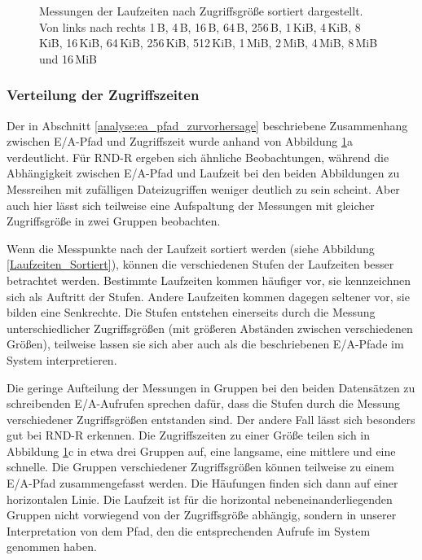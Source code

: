 \documentclass[
	twoside,
	12pt,
	a4paper,
	BCOR10mm,
	DIV14,
	listof=totoc,
	bibliography=totoc,
	headsepline
]{scrreprt}
\begin{document}
\begin{figure}
{	}	
	\caption{Messungen der Laufzeiten nach Zugriffsgröße sortiert dargestellt. Von links nach rechts 1\,B, 4\,B, 16\,B, 64\,B, 256\,B, 1\,KiB, 4\,KiB, 8\,KiB, 16\,KiB, 64\,KiB, 256\,KiB, 512\,KiB, 1\,MiB, 2\,MiB, 4\,MiB, 8\,MiB und 16\,MiB}
	\label{Laufzeiten_Zeitreihe}
\end{figure} 

\subsubsection{Verteilung der Zugriffszeiten}
Der in Abschnitt \ref{analyse:ea_pfad_zurvorhersage} beschriebene Zusammenhang zwischen E/A-Pfad und Zugriffszeit wurde anhand von Abbildung \ref{Laufzeiten_Zeitreihe}a verdeutlicht.
Für RND-R ergeben sich ähnliche Beobachtungen, während die Abhängigkeit zwischen E/A-Pfad und Laufzeit bei den beiden Abbildungen zu Messreihen mit zufälligen Dateizugriffen weniger deutlich zu sein scheint. Aber auch hier lässt sich teilweise eine Aufspaltung der Messungen mit gleicher Zugriffsgröße in zwei Gruppen beobachten.\medskip

Wenn die Messpunkte nach der Laufzeit sortiert werden (siehe Abbildung \ref{Laufzeiten_Sortiert}), können die verschiedenen Stufen der Laufzeiten besser betrachtet werden.
Bestimmte Laufzeiten kommen häufiger vor, sie kennzeichnen sich als Auftritt der Stufen. Andere Laufzeiten kommen dagegen seltener vor, sie bilden eine Senkrechte.
Die Stufen entstehen einerseits durch die Messung unterschiedlicher Zugriffsgrößen (mit größeren Abständen zwischen verschiedenen Größen), teilweise lassen sie sich aber auch als die beschriebenen E/A-Pfade im System interpretieren.\medskip

Die geringe Aufteilung der Messungen in Gruppen bei den beiden Datensätzen zu schreibenden E/A-Aufrufen sprechen dafür, dass die Stufen durch die Messung verschiedener Zugriffsgrößen entstanden sind.
Der andere Fall lässt sich besonders gut bei RND-R erkennen. Die Zugriffszeiten zu einer Größe teilen sich in Abbildung \ref{Laufzeiten_Zeitreihe}c in etwa drei Gruppen auf, eine langsame, eine mittlere und eine schnelle.
Die Gruppen verschiedener Zugriffsgrößen können teilweise zu einem E/A-Pfad zusammengefasst werden. Die Häufungen finden sich dann auf einer horizontalen Linie. 
Die Laufzeit ist für die horizontal nebeneinanderliegenden Gruppen nicht vorwiegend von der Zugriffsgröße abhängig, sondern in unserer Interpretation von dem Pfad, den die entsprechenden Aufrufe im System genommen haben. 
\end{document}
